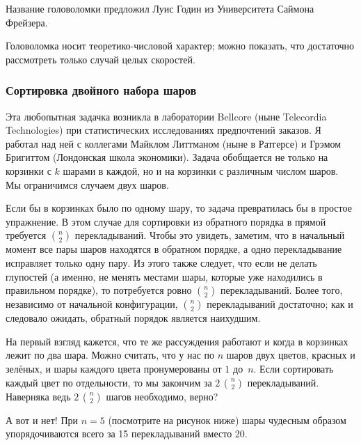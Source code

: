 \documentclass[twoside]{book}
\begin{document}
\medskip

Название головоломки предложил Луис Годин из Университета Саймона Фрейзера.

Головоломка носит теоретико-числовой характер; можно показать, что
достаточно рассмотреть только случай целых скоростей.

\subsubsection*{Сортировка двойного набора шаров}

Эта любопытная задачка возникла в лаборатории Bellcore (ныне
Telecordia Technologies) при статистических исследованиях предпочтений
заказов.
Я работал над ней с коллегами Майклом Литтманом (ныне в
Ратгерсе) и Грэмом Бригиттом (Лондонская школа экономики).
Задача
обобщается не только на корзинки с $k$ шарами в каждой, но и на
корзинки с различным числом шаров.
Мы ограничимся случаем двух шаров.

\medskip

Если бы в корзинках было по одному шару, то задача превратилась бы в
простое упражнение.
В этом случае для сортировки из обратного порядка
в прямой требуется $\binom{n}{2}$ перекладываний.
Чтобы это увидеть,
заметим, что в начальный момент все пары шаров находятся в обратном
порядке, а одно перекладывание исправляет только одну пару.
Из этого
также следует, что если не делать глупостей (а именно, не менять
местами шары, которые уже находились в правильном порядке), то
потребуется ровно $\binom{n}{2}$ перекладываний.
Более того,
независимо от начальной конфигурации, $\binom{n}{2}$ перекладываний
достаточно; как и следовало ожидать, обратный порядок является
наихудшим.

\medskip

На первый взгляд кажется, что те же рассуждения работают и когда в
корзинках лежит по два шара.
Можно считать, что у нас по $n$ шаров
двух цветов, красных и зелёных, и шары каждого цвета пронумерованы от
$1$ до~$n$.
Если сортировать каждый цвет по отдельности, то мы
закончим за $2\,\binom{n}{2}$ перекладываний.
Наверняка ведь 
$2\,\binom{n}{2}$ шагов необходимо, верно?

А вот и нет!  При $n = 5$ (посмотрите на рисунок ниже) шары чудесным
образом упорядочиваются всего за 15 перекладываний вместо 20.
\end{document}
